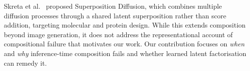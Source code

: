Skreta et al.~\citep{skreta2024superposition} proposed Superposition Diffusion, which
combines multiple diffusion processes through a shared latent superposition rather than
score addition, targeting molecular and protein design. While this extends composition
beyond image generation, it does not address the representational account of compositional
failure that motivates our work. Our contribution focuses on \emph{when} and \emph{why}
inference-time composition fails and whether learned latent factorisation can remedy it.
